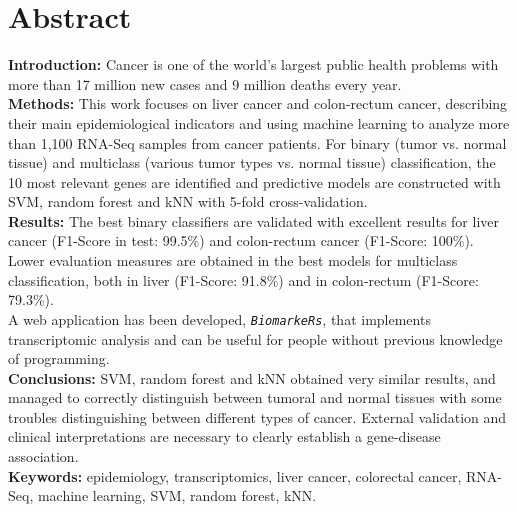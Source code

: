 \newpage
\thispagestyle{plain}

\section*{Abstract}

\textbf{Introduction:} Cancer is one of the world's largest public health problems with more than 17 million new cases and 9 million deaths every year. \\

\textbf{Methods:} This work focuses on liver cancer and colon-rectum cancer, describing their main epidemiological indicators and using machine learning to analyze more than 1,100 RNA-Seq samples from cancer patients. For binary (tumor vs. normal tissue) and multiclass (various tumor types vs. normal tissue) classification, the 10 most relevant genes are identified and predictive models are constructed with SVM, random forest and kNN with 5-fold cross-validation. \\

\textbf{Results:} The best binary classifiers are validated with excellent results for liver cancer (F1-Score in test: 99.5\%) and colon-rectum cancer (F1-Score: 100\%). Lower evaluation measures are obtained in the best models for multiclass classification, both in liver (F1-Score: 91.8\%) and in colon-rectum (F1-Score: 79.3\%). \\

A web application has been developed, \texttt {\textit{BiomarkeRs}}, that implements transcriptomic analysis and can be useful for people without previous knowledge of programming. \\

\textbf {Conclusions:} SVM, random forest and kNN obtained very similar results, and managed to correctly distinguish between tumoral and normal tissues with some troubles distinguishing between different types of cancer. External validation and clinical interpretations are necessary to clearly establish a gene-disease association.\\


\textbf{Keywords:} epidemiology, transcriptomics, liver cancer, colorectal cancer, RNA-Seq, machine learning, SVM, random forest, kNN.

\newpage
\thispagestyle{empty}

